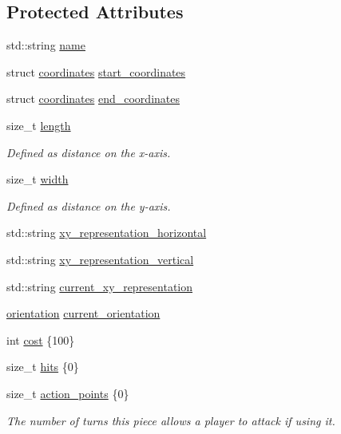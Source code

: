 \subsection*{Protected Attributes}
\begin{DoxyCompactItemize}
\item 
std\+::string \hyperlink{classbattle__ship_1_1vessel_a7c7d199acda1b8914c1b014d7d2893b3}{name}
\item 
struct \hyperlink{structbattle__ship_1_1coordinates}{coordinates} \hyperlink{classbattle__ship_1_1vessel_a32625627454fc279169a7d94ef460cd4}{start\+\_\+coordinates}
\item 
struct \hyperlink{structbattle__ship_1_1coordinates}{coordinates} \hyperlink{classbattle__ship_1_1vessel_a90baf292572ee968095c107ec656db32}{end\+\_\+coordinates}
\item 
size\+\_\+t \hyperlink{classbattle__ship_1_1vessel_a51d62e0235c1c5b8116618a864d82929}{length}
\begin{DoxyCompactList}\small\item\em Defined as distance on the x-\/axis. \end{DoxyCompactList}\item 
size\+\_\+t \hyperlink{classbattle__ship_1_1vessel_ac69519345fd0c9a39b55a15516506461}{width}
\begin{DoxyCompactList}\small\item\em Defined as distance on the y-\/axis. \end{DoxyCompactList}\item 
std\+::string \hyperlink{classbattle__ship_1_1vessel_a563ede7bcd45c64f897f727ce2ca50ff}{xy\+\_\+representation\+\_\+horizontal}
\item 
std\+::string \hyperlink{classbattle__ship_1_1vessel_a7ab3092931ae7f230cb2cca77f2612c5}{xy\+\_\+representation\+\_\+vertical}
\item 
std\+::string \hyperlink{classbattle__ship_1_1vessel_ac49c1b9fd8b63846dac12053cebb1d00}{current\+\_\+xy\+\_\+representation}
\item 
\hyperlink{namespacebattle__ship_aed87488f0a73f0d0679fe343fb61c784}{orientation} \hyperlink{classbattle__ship_1_1vessel_ae0e05c0f43e6fe6c01bf1534ebece971}{current\+\_\+orientation}
\item 
int \hyperlink{classbattle__ship_1_1vessel_aaf2677260fd0f0ce56678cd23b8a0591}{cost} \{100\}
\item 
size\+\_\+t \hyperlink{classbattle__ship_1_1vessel_a1a14cc37d607ba7f3b710b36a11ff2e0}{hits} \{0\}
\item 
size\+\_\+t \hyperlink{classbattle__ship_1_1vessel_a5d2b710e2b58847818ba8e22794a97a4}{action\+\_\+points} \{0\}
\begin{DoxyCompactList}\small\item\em The number of turns this piece allows a player to attack if using it. \end{DoxyCompactList}\end{DoxyCompactItemize}


